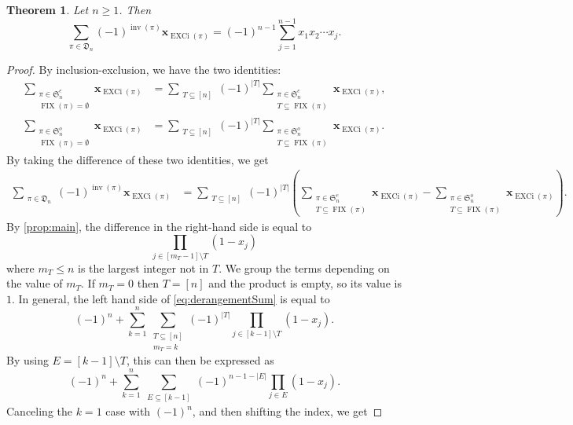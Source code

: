 \documentclass[reqno]{amsart}
\newtheorem{theorem}{Theorem}
\theoremstyle{definition}
\newcommand{\xvec}{\mathbf{x}}
\newcommand{\symS}{\mathfrak{S}}
\newcommand{\dArr}{\mathfrak{D}}
\DeclareMathOperator{\inv}{inv}
\DeclareMathOperator{\FIX}{FIX}
\DeclareMathOperator{\EXCi}{EXCi}
\begin{document}
\begin{theorem}\label{thm:mainGenFunc}
Let $n\geq 1$. Then
\begin{equation}\label{eq:derangementSum}
 \sum_{\pi \in \dArr_n } (-1)^{\inv(\pi)} \xvec_{\EXCi(\pi)} = 
 (-1)^{n-1} \sum_{j=1}^{n-1} x_{1}x_{2}\dotsm x_{j}.
\end{equation}
\end{theorem}
\begin{proof}
By inclusion-exclusion, we have the two identities:
\begin{align*}
 \sum_{\substack{\pi \in \symS^e_n \\ \FIX(\pi)=\emptyset}} \xvec_{\EXCi(\pi)}
 &=
 \sum_{\substack{T \subseteq [n]  }}
 (-1)^{|T|} \sum_{\substack{\pi \in  \symS^e_n  \\ T \subseteq \FIX(\pi)   }} \xvec_{\EXCi(\pi)},\\
%
 \sum_{\substack{\pi \in \symS^o_n \\ \FIX(\pi)=\emptyset}} \xvec_{\EXCi(\pi)}
 &=
 \sum_{\substack{T \subseteq [n]   }}
 (-1)^{|T|} \sum_{\substack{\pi \in  \symS^o_n  \\ T \subseteq \FIX(\pi)   }} \xvec_{\EXCi(\pi)}.
\end{align*}
%
%
By taking the difference of these two identities, we get
\begin{align*}
 \sum_{\substack{\pi \in \dArr_n }} (-1)^{\inv(\pi)} \xvec_{\EXCi(\pi)}
 &=
\sum_{\substack{T \subseteq [n] }}
 (-1)^{|T|}
\left( 
 \sum_{\substack{\pi \in  \symS^e_n  \\ T \subseteq \FIX(\pi)   }} \xvec_{\EXCi(\pi)} 
 -
 \sum_{\substack{\pi \in  \symS^o_n  \\ T \subseteq \FIX(\pi)   }} \xvec_{\EXCi(\pi)}
\right). 
\end{align*}
By \cref{prop:main}, the difference in the right-hand side is equal to 
\[
  \prod_{ j \in [m_T-1]\setminus T } (1-x_j)
\]
where $m_T\leq n$ is the largest integer not in $T$.
We group the terms depending on the value of $m_T$.
If $m_T=0$ then $T=[n]$ and the product is empty, so its value is $1$.
In general, the left hand side of \eqref{eq:derangementSum} is equal to
\[
(-1)^{n} + 
 \sum_{k=1}^n \sum_{\substack{T \subseteq [n] \\ m_T = k}} (-1)^{|T|}
 \prod_{ j \in [k-1]\setminus T } (1-x_j). 
 \]
By using $E = [k-1]\setminus T$, this can then be expressed as
 \[
 (-1)^{n} +
 \sum_{k=1}^n 
 \sum_{\substack{E \subseteq [k-1]}} (-1)^{n-1-|E|}
 \prod_{ j \in E } (1-x_j).
\]
Canceling the $k=1$ case with $(-1)^{n}$, and then shifting the index, we get

\end{proof}
\end{document}
